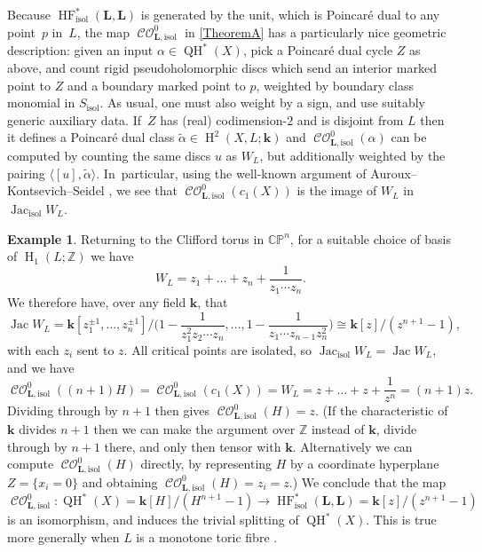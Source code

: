 \documentclass[JEP,XML,SOM,Unicode,NoEqCountersInSection,NoFloatCountersInSection,published]{cedram}
\theoremstyle{definition}
\newtheorem{example}[theorem]{Example}
\newcommand{\CC}{\mathbb{C}}
\newcommand{\ZZ}{\mathbb{Z}}
\newcommand{\PP}{\mathbb{P}}
\newcommand{\kk}{{\boldsymbol{k}}}
\newcommand{\bL}{{\boldsymbol{L}}}
\newcommand{\isol}{\mathrm{isol}}
\newcommand{\rH}{\operatorname{H}}
\newcommand{\HF}{\operatorname{HF}}
\newcommand{\CO}{\operatorname{\mathcal{CO}}}
\newcommand{\QH}{\operatorname{QH}}
\newcommand{\Jac}{\operatorname{Jac}}
\newcommand{\Jacisol}{\operatorname{Jac}_\isol}
\begin{document}
Because $\HF^*_\isol(\bL, \bL)$ is generated by the unit, which is Poincaré dual to any point~$p$ in~$L$, the map $\CO^0_{\bL, \isol}$ in \cref{TheoremA} has a particularly nice geometric description: given an input $\alpha \in \QH^*(X)$, pick a Poincaré dual cycle $Z$ as above, and count rigid pseudoholomorphic discs which send an interior marked point to $Z$ and a boundary marked point to $p$, weighted by boundary class monomial in $S_\isol$. As usual, one must also weight by a sign, and use suitably generic auxiliary data. If~$Z$ has (real) codimension-$2$ and is disjoint from $L$ then it defines a Poincaré dual class $\widetilde{\alpha} \in \rH^2(X, L; \kk)$ and $\CO^0_{\bL, \isol}(\alpha)$ can be computed by counting the same discs $u$ as $W_L$, but additionally weighted by the pairing $\langle [u], \widetilde{\alpha} \rangle$. In~particular, using the well-known argument of Auroux--Kontsevich--Seidel \cite[Lem.\,6.7]{AurouxTDuality}, we see that $\CO^0_{\bL, \isol}(c_1(X))$ is the image of $W_L$ in $\Jacisol W_L$.

\begin{example}
Returning to the Clifford torus in $\CC\PP^n$, for a suitable choice of basis of $\rH_1(L; \ZZ)$ we have
\[
W_L = z_1 + \dots + z_n + \frac{1}{z_1 \cdots z_n}.
\]
We therefore have, over any field $\kk$, that
\[
\Jac W_L = \kk[z_1^{\pm 1}, \dots, z_n^{\pm 1}] \Big/ \Big(1 - \frac{1}{z_1^2 z_2 \cdots z_n}, \dots, 1 - \frac{1}{z_1 \cdots z_{n-1} z_n^2} \Big) \cong \kk[z] / (z^{n+1} - 1),
\]
with each $z_i$ sent to $z$. All critical points are isolated, so $\Jacisol W_L = \Jac W_L$, and we have
\[
\CO^0_{\bL, \isol}((n+1)H) = \CO^0_{\bL, \isol}(c_1(X)) = W_L = z + \dots + z + \frac{1}{z^n} = (n+1)z.
\]
Dividing through by $n+1$ then gives $\CO^0_{\bL, \isol}(H) = z$. (If the characteristic of $\kk$ divides $n+1$ then we can make the argument over $\ZZ$ instead of $\kk$, divide through by $n+1$ there, and only then tensor with $\kk$. Alternatively we can compute $\CO^0_{\bL, \isol}(H)$ directly, by representing $H$ by a coordinate hyperplane $Z = \{x_i = 0\}$ and obtaining $\CO^0_{\bL, \isol}(H) = z_i = z$.) We conclude that the map
\[
\CO^0_{\bL, \isol} : \QH^*(X) = \kk[H]/(H^{n+1} - 1) \to \HF^*_\isol(\bL, \bL) = \kk[z]/(z^{n+1} - 1)
\]
is an isomorphism, and induces the trivial splitting of $\QH^*(X)$. This is true more generally when $L$ is a monotone toric fibre \cite{FOOOMirror}.
\end{example}
\end{document}
